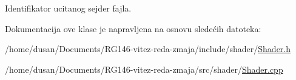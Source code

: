 Identifikator ucitanog sejder fajla. 



Dokumentacija ove klase je napravljena na osnovu sledećih datoteka\+:\begin{DoxyCompactItemize}
\item 
/home/dusan/\+Documents/\+R\+G146-\/vitez-\/reda-\/zmaja/include/shader/\hyperlink{Shader_8h}{Shader.\+h}\item 
/home/dusan/\+Documents/\+R\+G146-\/vitez-\/reda-\/zmaja/src/shader/\hyperlink{Shader_8cpp}{Shader.\+cpp}\end{DoxyCompactItemize}
